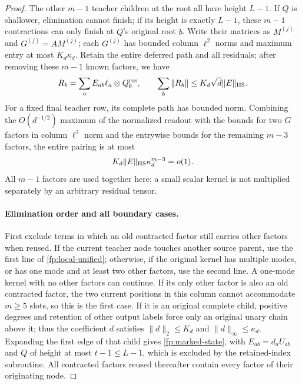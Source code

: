 \documentclass[a4paper]{tufte-handout}
\begin{document}
\begin{fullwidth}
\begin{proof}
The other $m-1$ teacher children at the root all have height $L-1$. If $Q$ is shallower, elimination cannot finish;
if its height is exactly $L-1$, these $m-1$ contractions can only finish at $Q$'s original root $b$.
Write their matrices as $M^{(j)}$ and $G^{(j)}=AM^{(j)}$; each $G^{(j)}$ has bounded column $\ell^2$ norms
and maximum entry at most $K_d\kappa_d$. Retain the entire deferred path and all residuals; after removing these $m-1$ known factors, we have
\[
 R_b=\sum_aE_{ab}\ell_a\otimes Q_b^{\rm res},\qquad
 \sum_b\|R_b\|\le K_d\sqrt d\|E\|_{\rm HS}.
\]
For a fixed final teacher row, its complete path has bounded norm. Combining the $O(d^{-1/2})$ maximum of the normalized readout
with the bounds for two $G$ factors in column $\ell^2$ norm and the entrywise bounds for the remaining $m-3$ factors, the entire pairing is at most
\begin{equation}\label{fp:marked-terminal}
 K_d\|E\|_{\rm HS}\kappa_d^{m-3}=o(1).
\end{equation}
All $m-1$ factors are used together here; a small scalar kernel is not multiplied separately by an arbitrary residual tensor.

\paragraph{Elimination order and all boundary cases.}
First exclude terms in which an old contracted factor still carries other factors when reused.
If the current teacher node touches another source parent, use the first line of \eqref{fp:local-unified};
otherwise, if the original kernel has multiple modes, or has one mode and at least two other factors, use the second line.
A one-mode kernel with no other factors can continue. If its only other factor is also an old contracted factor,
the two current positions in this column cannot accommodate $m\ge5$ slots, so this is the first case.
If it is an original complete child, positive degrees and retention of other output labels force only an original unary chain above it;
thus the coefficient $d$ satisfies $\|d\|_2\le K_d$ and $\|d\|_\infty\le\kappa_d$.
Expanding the first edge of that child gives \eqref{fp:marked-state}, with
$E_{ab}=d_aU_{ab}$ and $Q$ of height at most $t-1\le L-1$, which is excluded by the retained-index subroutine.
All contracted factors reused thereafter contain every factor of their originating node.


\end{proof}
\end{fullwidth}
\end{document}
